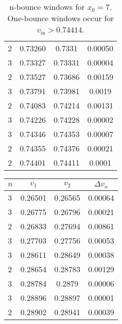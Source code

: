 \documentclass[vecphys]{svmult}		%
\begin{document}
{\begin{table}
\begin{center}
{\begin{tabular}{|l|c|c|c|}
		2 & 0.73260 & 0.7331 & 0.00050 \\
		3 & 0.73327 & 0.73331 &  0.00004 \\
		
		2 & 0.73527 & 0.73686 & 0.00159 \\
		 3& 0.73791 &0.73981 & 0.0019\\
		 
		 
		 2& 0.74083 & 0.74214& 0.00131\\
		 
		 3&0.74226  &0.74228  & 0.00002 \\
		 
		 3&0.74346  & 0.74353& 0.00007 \\
		 
		 2&0.74355  &0.74376& 0.00021 \\
		 2&0.74401  & 0.74411 & 0.0001\\
		

		
		\hline
		\end{tabular}

\caption{n-bounce windows for $x_0=7$. One-bounce windows occur for $v_\mathrm{in}>0.74414$.}


}
\end{center}
\end{table}

\begin{table}\label{mb-x0_2_1}
\begin{center}
{
 \begin{tabular}{|l|c|c|c|}
		\hline
		$n$ & $v_1$ & $v_2$ & $\Delta v_n$ \\
		\hline
		3 & 0.26501 &  0.26565 & 0.00064  \\
		3 & 0.26775 & 0.26796 & 0.00021 \\
		2 & 0.26833 & 0.27694 & 0.00861 \\
		3 & 0.27703 &0.27756 & 0.00053 \\
		3 &0.28611  & 0.28649& 0.00038 \\
		2 & 0.28654 & 0.28783 & 0.00129 \\ 
		3 & 0.28784 &0.2879 & 0.00006\\
		3 & 0.28896 & 0.28897 & 0.00001\\
		2 &0.28902 &  0.28941& 0.00039 \\
		

\end{tabular}}
\end{center}
\end{table}}
\end{document}
